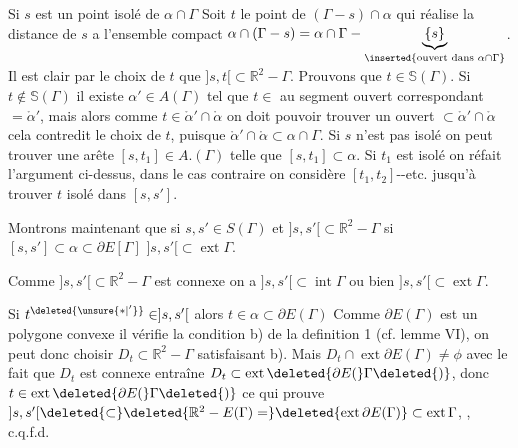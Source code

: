 Si $s$ est un point isolé de $\alpha\cap\Gamma$ Soit $t$ le point de $(\Gamma-s)\cap\alpha$ qui réalise la distance de $s$ a l'ensemble compact $\alpha\cap(\Gamma-s)=\alpha\cap\Gamma-\underbrace{\{s\}}_{\inserted{\text{ouvert dans }\alpha\cap\Gamma}}$. Il est clair par le choix de $t$ que $]s,t[\subset\mathbb{R}^{2}-\Gamma$. Prouvons que $t\in\mathbb{S}(\Gamma)$. Si $t\notin\mathbb{S}(\Gamma)$ il existe $\alpha'\in A(\Gamma)$ tel que $t\in$ au segment ouvert correspondant $=\mathring{\alpha}'$, mais alors comme $t\in\mathring{\alpha}'\cap\mathring{\alpha}$ on doit pouvoir trouver un ouvert $\subset\mathring{\alpha}'\cap\mathring{\alpha}$  cela contredit le choix de $t$, puisque $\mathring{\alpha}'\cap\mathring{\alpha}\subset\alpha\cap\Gamma$. Si $s$ n'est pas isolé on peut trouver une arête $[s,t_1]\in A.(\Gamma)$ telle que $[s,t_1]\subset\alpha$. Si $t_1$ est isolé on réfait l'argument ci-dessus, dans le cas contraire on considère $[t_1,t_2]$-{}-etc. jusqu'à trouver $t$ isolé dans $[s,s']$.

Montrons maintenant que si $s,s'\in S(\Gamma)$ et $]s,s'[\subset\mathbb{R}^{2}-\Gamma$ si $[s,s']\subset\alpha\subset\partial E[\Gamma]$ $]s,s'[\subset\operatorname{ext}\Gamma$.

Comme $]s,s'[\subset\mathbb{R}^{2}-\Gamma$ est connexe on a $]s,s'[\subset\operatorname{int}\Gamma$ ou bien $]s,s'[\subset\operatorname{ext}\Gamma$.

Si $t^{\deleted{\unsure{*|'}}}\in ]s,s'[$ alors $t\in\alpha\subset\partial E(\Gamma)$  Comme $\partial E(\Gamma)$ est un polygone convexe il vérifie la condition b) de la definition 1 (cf. lemme VI), on peut donc choisir $D_t\subset\mathbb{R}^{2}-\Gamma$ satisfaisant b). Mais $D_t\cap\operatorname{ext}\partial E(\Gamma)\ne\phi$  avec le fait que $D_t$ est connexe entraîne $D_t\subset\operatorname{ext}\deleted{\partial E(}\Gamma\deleted{)}$, donc $t\in\operatorname{ext}\deleted{\partial E(}\Gamma\deleted{)}$ ce qui prouve  $]s,s'[\deleted{\subset}\deleted{\mathbb{R}^{2}-E(\Gamma)=}\deleted{\operatorname{ext}\partial E(\Gamma)}\subset\operatorname{ext}\Gamma$, , c.q.f.d.

